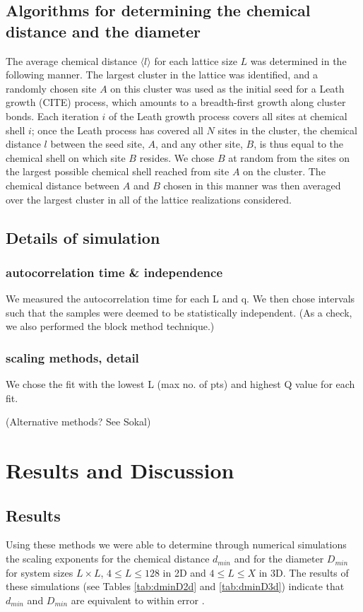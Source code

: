 \documentclass[pre,preprint]{revtex4-1}
\begin{document}
\subsection{Algorithms for determining the chemical distance and the diameter} %

The average chemical distance $\langle l \rangle$ for each lattice size $L$ was determined in the following manner. The largest cluster in the lattice was identified, and a randomly chosen site $A$ on this cluster was used as the initial seed for a Leath growth (CITE) process, which amounts to a breadth-first growth along cluster bonds.   Each iteration $i$ of the Leath growth process covers all sites at chemical shell $i$;  once the Leath process has covered all $N$ sites in the cluster, the chemical distance $l$ between the seed site, $A$, and any other site, $B$, is thus equal to the chemical shell on which site $B$ resides.  We chose $B$ at random from the sites on the largest possible chemical shell reached from site $A$ on the cluster.  The chemical distance between $A$ and $B$ chosen in this manner was then averaged over the largest cluster in all of the lattice realizations considered.  
\subsection{Details of simulation}

\subsubsection{autocorrelation time \& independence}
We measured the autocorrelation time for each L and q.  We then chose intervals such that the samples were deemed to be statistically independent.
(As a check, we also performed the block method technique.)

\subsubsection{scaling methods, detail}
We chose the fit with the lowest L (max no. of pts) and highest Q value for each fit.

(Alternative methods? See Sokal)

\section{Results and Discussion}

\subsection{Results}
Using these methods we were able to determine through numerical simulations the scaling exponents for the chemical distance $d_{min}$ and for the diameter $D_{min}$ for system sizes $L \times  L$, $4 \le L \le 128$ in 2D and   $4 \le L \le X$ in 3D.  The results of these simulations (see Tables \ref{tab:dminD2d} and \ref{tab:dminD3d}) indicate that $d_{min}$ and $D_{min}$ are equivalent to within error .  
\end{document}
